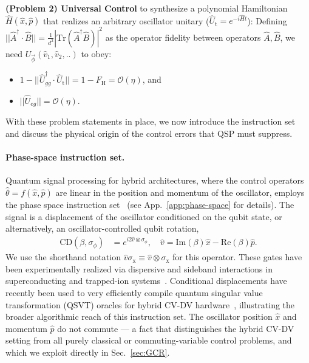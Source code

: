 \documentclass[aps,prx,showpacs,notitlepage,twocolumn,superscriptaddress,nofootinbib,preprintnumbers,floatfix,10pt, longbibliography]{revtex4-2}
\begin{document}
  \textbf{(Problem 2) Universal Control} to synthesize a polynomial Hamiltonian $\hat H (\hat x,\hat p)$ that realizes an arbitrary oscillator unitary ($\hat U_\mathrm{t}=e^{-i\hat Ht}$): Defining $||\hat A^\dagger \cdot \hat B||=\frac{1}{d^2}|\mathrm{Tr}(\hat A^\dagger \hat B)|^2$ as the operator fidelity between operators $\hat A,\hat B$, we need $U_{\vec{\phi}}(\hat v_1,\hat v_2,..)$ to obey: %
  \begin{itemize}
  \item $1-||\hat U_{gg}^\dagger \cdot \hat U_\mathrm{t}||=1-F_\mathrm{H} =\mathcal{O}(\eta)$, and
  \item $||\hat U_{eg}||=\mathcal{O}(\eta)$.
  \end{itemize}

With these problem statements in place, we now introduce the instruction set and discuss the physical origin of the control errors that QSP must suppress.

\paragraph{Phase-space instruction set.} Quantum signal processing for hybrid architectures, where the control operators $\hat \theta=f(\hat x,\hat p)$ are linear in the position and momentum of the oscillator, employs the phase space instruction set~\cite{ISA} (see App.~\ref{app:phase-space} for details). The signal is a displacement of the oscillator conditioned on the qubit state, or alternatively, an oscillator-controlled qubit rotation,
\begin{align}
\mathrm{CD}(\beta,\sigma_\phi)&=e^{i2\hat v \otimes \sigma_\phi},\quad\hat v = \mathrm{Im}(\beta)\hat x - \mathrm{Re}(\beta)\hat p.\label{eq:hatvbetadef}
\end{align}
We use the shorthand notation $\hat v\sigma_\mathrm{x}\equiv \hat v\otimes \sigma_\mathrm{x}$ for this operator. These gates have been experimentally realized via dispersive and sideband interactions in superconducting and trapped-ion systems~\cite{eickbusch2022fast,fluhmann2019encoding,de2022error}. Conditional displacements have recently been used to very efficiently compile quantum singular value transformation (QSVT) oracles for hybrid CV-DV hardware~\cite{LukeBellQSVT}, illustrating the broader algorithmic reach of this instruction set. The oscillator position $\hat x$ and momentum $\hat p$ do not commute --- a fact that distinguishes the hybrid CV-DV setting from all purely classical or commuting-variable control problems, and which we exploit directly in Sec.~\ref{sec:GCR}.
\end{document}
